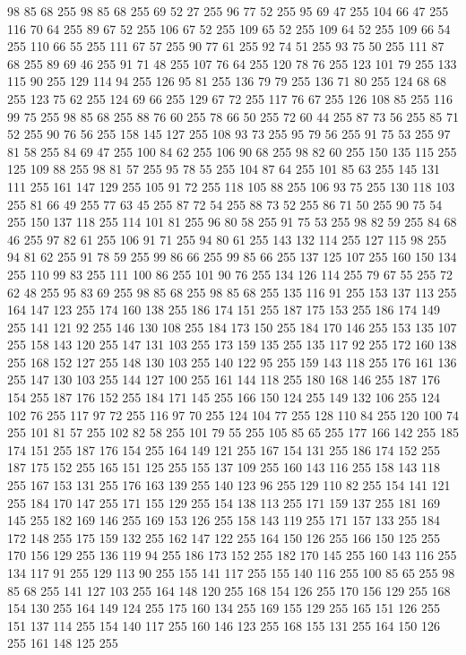 98 85 68 255 98 85 68 255 69 52 27 255 96 77 52 255 95 69 47 255 104 66 47 255 116 70 64 255 89 67 52 255 106 67 52 255 109 65 52 255 109 64 52 255 109 66 54 255 110 66 55 255 111 67 57 255 90 77 61 255 92 74 51 255 93 75 50 255 111 87 68 255 89 69 46 255 91 71 48 255 107 76 64 255 120 78 76 255 123 101 79 255 133 115 90 255 129 114 94 255 126 95 81 255 136 79 79 255 136 71 80 255 124 68 68 255 123 75 62 255 124 69 66 255 129 67 72 255 117 76 67 255 126 108 85 255 116 99 75 255 98 85 68 255 88 76 60 255 78 66 50 255 72 60 44 255 87 73 56 255 85 71 52 255 90 76 56 255 158 145 127 255 108 93 73 255 95 79 56 255 91 75 53 255 97 81 58 255 84 69 47 255 100 84 62 255 106 90 68 255 98 82 60 255 150 135 115 255 125 109 88 255 98 81 57 255 95 78 55 255 104 87 64 255 101 85 63 255 145 131 111 255 161 147 129 255 105 91 72 255 118 105 88 255 106 93 75 255 130 118 103 255 81 66 49 255
77 63 45 255 87 72 54 255 88 73 52 255 86 71 50 255 90 75 54 255 150 137 118 255 114 101 81 255 96 80 58 255 91 75 53 255 98 82 59 255 84 68 46 255 97 82 61 255 106 91 71 255 94 80 61 255 143 132 114 255 127 115 98 255 94 81 62 255 91 78 59 255 99 86 66 255 99 85 66 255 137 125 107 255 160 150 134 255 110 99 83 255 111 100 86 255 101 90 76 255 134 126 114 255 79 67 55 255 72 62 48 255 95 83 69 255 98 85 68 255 98 85 68 255 135 116 91 255 153 137 113 255 164 147 123 255 174 160 138 255 186 174 151 255 187 175 153 255 186 174 149 255 141 121 92 255 146 130 108 255 184 173 150 255 184 170 146 255 153 135 107 255 158 143 120 255 147 131 103 255 173 159 135 255 135 117 92 255 172 160 138 255 168 152 127 255 148 130 103 255 140 122 95 255 159 143 118 255 176 161 136 255 147 130 103 255 144 127 100 255 161 144 118 255 180 168 146 255 187 176 154 255 187 176 152 255 184 171 145 255 166 150 124 255 149 132 106 255 124 102 76 255 117 97 72 255
116 97 70 255 124 104 77 255 128 110 84 255 120 100 74 255 101 81 57 255 102 82 58 255 101 79 55 255 105 85 65 255 177 166 142 255 185 174 151 255 187 176 154 255 164 149 121 255 167 154 131 255 186 174 152 255 187 175 152 255 165 151 125 255 155 137 109 255 160 143 116 255 158 143 118 255 167 153 131 255 176 163 139 255 140 123 96 255 129 110 82 255 154 141 121 255 184 170 147 255 171 155 129 255 154 138 113 255 171 159 137 255 181 169 145 255 182 169 146 255 169 153 126 255 158 143 119 255 171 157 133 255 184 172 148 255 175 159 132 255 162 147 122 255 164 150 126 255 166 150 125 255 170 156 129 255 136 119 94 255 186 173 152 255 182 170 145 255 160 143 116 255 134 117 91 255 129 113 90 255 155 141 117 255 155 140 116 255 100 85 65 255 98 85 68 255 141 127 103 255 164 148 120 255 168 154 126 255 170 156 129 255 168 154 130 255 164 149 124 255 175 160 134 255 169 155 129 255 165 151 126 255 151 137 114 255 154 140 117 255 160 146 123 255 168 155 131 255 164 150 126 255 161 148 125 255
